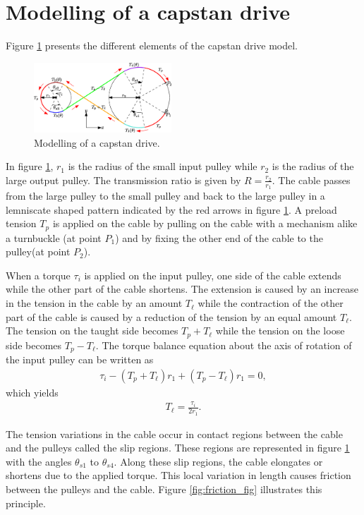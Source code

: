 \documentclass[twocolumn,10pt]{asme2ej}
\begin{document}
\section{Modelling of a capstan drive}
Figure \ref{fig:model_capstan} presents the different elements of the capstan drive model.
\begin{figure}
    \centering
    \includegraphics[width=0.46\textwidth]{modelling_of_capstan_drive.eps}
    \caption{Modelling of a capstan drive.}
    \label{fig:model_capstan}
\end{figure}
In figure \ref{fig:model_capstan}, $r_1$ is the radius of the small input pulley while $r_2$ is the radius of the large output pulley. The transmission ratio is given by $R = \frac{r_2}{r_1}$. The cable passes from the large pulley to the small pulley and back to the large pulley in a lemniscate shaped pattern indicated by the red arrows in figure \ref{fig:model_capstan}. A preload tension $T_p$ is applied on the cable by pulling on the cable with a mechanism alike a turnbuckle (at point $P_1$) and by fixing the other end of the cable to the pulley(at point $P_2$).\par
When a torque $\tau_i$ is applied on the input pulley, one side of the cable extends while the other part of the cable shortens. The extension is caused by an increase in the tension in the cable by an amount $T_\ell$ while the contraction of the other part of the cable is caused by a reduction of the tension by an equal amount $T_\ell$. The tension on the taught side becomes $T_p+T_\ell$ while the tension on the loose side becomes $T_p-T_\ell$. The torque balance equation about the axis of rotation of the input pulley can be written as
\begin{align}
    \tau_i - (T_p+T_\ell)r_1 + (T_p-T_\ell)r_1 = 0, \label{eq:first_equation_p0}
\end{align}
which yields
\begin{align}
T_\ell = \frac{\tau_i}{2r_1}.
\label{eq:first_equation}
\end{align}
\par
The tension variations in the cable occur in contact regions between the cable and the pulleys called the slip regions. These regions are represented in figure \ref{fig:model_capstan} with the angles $\theta_{s1}$ to $\theta_{s4}$. Along these slip regions, the cable elongates or shortens due to the applied torque. This local variation in length causes friction between the pulleys and the cable. Figure \ref{fig:friction_fig} illustrates this principle. 
\end{document}
